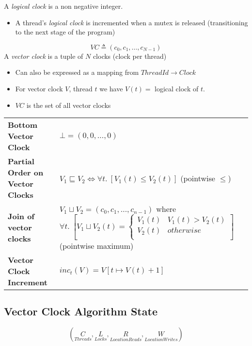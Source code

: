 A \textit{logical clock} is a non negative integer.
\begin{itemize}
    \item A thread's \textit{logical clock} is incremented when a mutex is released (transitioning to the next stage of the program)
\end{itemize}

\[VC \triangleq (c_0, c_1, \dots , c_{N-1})\]
A \textit{vector clock} is a tuple of $N$ clocks (clock per thread)
\begin{itemize}
    \item Can also be expressed as a mapping from $ThreadId \to Clock$
    \item For vector clock $V$, thread $t$ we have $V(t) =$ logical clock of $t$.
    \item $VC$ is the set of all vector clocks
\end{itemize}
\begin{center}
    \begin{tabular}{l p{}}
        \textbf{Bottom Vector Clock} & $\bot = (0,0, \dots, 0)$ \\
        \textbf{Partial Order on Vector Clocks} & $V_1 \sqsubseteq V_2 \Leftrightarrow \forall t . \ [V_1(t) \leq V_2(t)]$ (pointwise $\leq$) \\
        \textbf{Join of vector clocks} & $V_1 \sqcup V_2 = (c_0, c_1, \dots, c_{n-1})$ where \newline $\forall t . \ [V_1 \sqcup V_2 (t) = \begin{cases}
            V_1(t) & V_1(t) > V_2(t) \\
            V_2(t) & otherwise \\
        \end{cases}]$ (pointwise maximum) \\
        \textbf{Vector Clock Increment} & $inc_t(V) = V[t \mapsto V(t) + 1]$
    \end{tabular}
\end{center}

\subsection{Vector Clock Algorithm State}
\[(\underset{Threads}{C}, \underset{Locks}{L}, \underset{Location Reads}{R}, \underset{Location Writes}{W})\]
